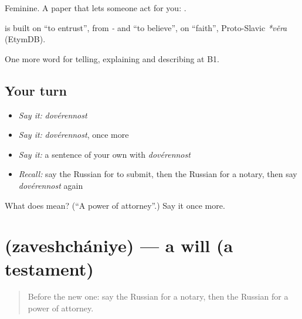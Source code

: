 Feminine. A paper that lets someone act for you: \emph{ }.

\begin{cousinweb}
\textbf{} is built on \emph{} \textquotedblleft{}to entrust\textquotedblright{}, from \emph{-} and \emph{} \textquotedblleft{}to believe\textquotedblright{}, on \emph{} \textquotedblleft{}faith\textquotedblright{}, Proto-Slavic \emph{*věra} (EtymDB).
\end{cousinweb}

\begin{grammarlens}[title={What you've built}]
One more word for telling, explaining and describing at B1.
\end{grammarlens}

\subsection*{Your turn}
\begin{itemize}
\raggedright
  \item \emph{Say it:} \emph{dovérennost}
  \item \emph{Say it:} \emph{dovérennost}, once more
  \item \emph{Say it:} a sentence of your own with \emph{dovérennost}
  \item \emph{Recall:} say the Russian for to submit, then the Russian for a notary, then say \emph{dovérennost} again
\end{itemize}

\begin{tcolorbox}[breakable,colback=teal!4,colframe=teal!35!black,title={Before you move on}]
What does  mean? (\textquotedblleft{}A power of attorney\textquotedblright{}.) Say it once more.
\end{tcolorbox}
\section[\texorpdfstring{\ru{завещание} (zaveshchániye)}{завещание (zaveshchániye)}]{ (zaveshchániye) — a will (a testament)}

\label{lesson:RU-C393-zaveshchanie}



\begin{quote}
Before the new one: say the Russian for a notary, then the Russian for a power of attorney.
\end{quote}

